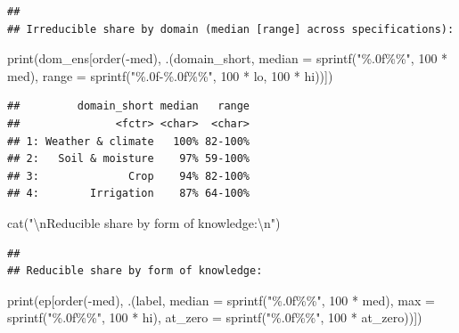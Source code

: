\documentclass[
  11pt,
]{article}
\newenvironment{Shaded}{\begin{snugshade}}{\end{snugshade}}
\newcommand{\AttributeTok}[1]{\textcolor[rgb]{0.77,0.63,0.00}{#1}}
\newcommand{\DecValTok}[1]{\textcolor[rgb]{0.00,0.00,0.81}{#1}}
\newcommand{\FunctionTok}[1]{\textcolor[rgb]{0.00,0.00,0.00}{#1}}
\newcommand{\NormalTok}[1]{#1}
\newcommand{\SpecialCharTok}[1]{\textcolor[rgb]{0.00,0.00,0.00}{#1}}
\newcommand{\StringTok}[1]{\textcolor[rgb]{0.31,0.60,0.02}{#1}}
\begin{document}
\begin{verbatim}
## 
## Irreducible share by domain (median [range] across specifications):
\end{verbatim}

\begin{Shaded}
\begin{Highlighting}[]
\FunctionTok{print}\NormalTok{(dom\_ens[}\FunctionTok{order}\NormalTok{(}\SpecialCharTok{{-}}\NormalTok{med), .(domain\_short, }\AttributeTok{median =} \FunctionTok{sprintf}\NormalTok{(}\StringTok{"\%.0f\%\%"}\NormalTok{, }\DecValTok{100} \SpecialCharTok{*}\NormalTok{ med),}
                             \AttributeTok{range =} \FunctionTok{sprintf}\NormalTok{(}\StringTok{"\%.0f{-}\%.0f\%\%"}\NormalTok{, }\DecValTok{100} \SpecialCharTok{*}\NormalTok{ lo, }\DecValTok{100} \SpecialCharTok{*}\NormalTok{ hi))])}
\end{Highlighting}
\end{Shaded}

\begin{verbatim}
##         domain_short median   range
##               <fctr> <char>  <char>
## 1: Weather & climate   100% 82-100%
## 2:   Soil & moisture    97% 59-100%
## 3:              Crop    94% 82-100%
## 4:        Irrigation    87% 64-100%
\end{verbatim}

\begin{Shaded}
\begin{Highlighting}[]
\FunctionTok{cat}\NormalTok{(}\StringTok{"}\SpecialCharTok{\textbackslash{}n}\StringTok{Reducible share by form of knowledge:}\SpecialCharTok{\textbackslash{}n}\StringTok{"}\NormalTok{)}
\end{Highlighting}
\end{Shaded}

\begin{verbatim}
## 
## Reducible share by form of knowledge:
\end{verbatim}

\begin{Shaded}
\begin{Highlighting}[]
\FunctionTok{print}\NormalTok{(ep[}\FunctionTok{order}\NormalTok{(}\SpecialCharTok{{-}}\NormalTok{med), .(label, }\AttributeTok{median =} \FunctionTok{sprintf}\NormalTok{(}\StringTok{"\%.0f\%\%"}\NormalTok{, }\DecValTok{100} \SpecialCharTok{*}\NormalTok{ med),}
                        \AttributeTok{max =} \FunctionTok{sprintf}\NormalTok{(}\StringTok{"\%.0f\%\%"}\NormalTok{, }\DecValTok{100} \SpecialCharTok{*}\NormalTok{ hi),}
                        \AttributeTok{at\_zero =} \FunctionTok{sprintf}\NormalTok{(}\StringTok{"\%.0f\%\%"}\NormalTok{, }\DecValTok{100} \SpecialCharTok{*}\NormalTok{ at\_zero))])}
\end{Highlighting}
\end{Shaded}
\end{document}
